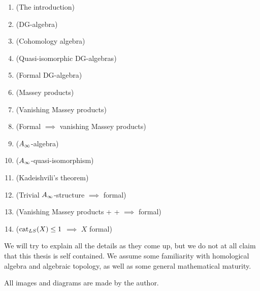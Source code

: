\begin{enumerate}
	\item {} (The introduction)
	\item {} (DG-algebra)
	\item {} (Cohomology algebra)
	\item {} (Quasi-isomorphic DG-algebras)
	\item {} (Formal DG-algebra)
	\item {} (Massey products)
	\item {} (Vanishing Massey products)
	\item {} (Formal $\implies$ vanishing Massey products)
	\item {} ($A_{\infty}$-algebra)
	\item {} ($A_{\infty}$-quasi-isomorphism)
	\item {} (Kadeishvili's theorem)
	\item {} (Trivial $A_{\infty}$-structure $\implies$ formal)
	\item {} (Vanishing Massey products + + $\implies$ formal)
	\item {} ($\text{cat}_{LS}(X)\leq 1$ $\implies$ $X$ formal)
\end{enumerate}

We will try to explain all the details as they come up, but we do not at all claim that this thesis is self contained. We assume some familiarity with homological algebra and algebraic topology, as well as some general mathematical maturity. 

All images and diagrams are made by the author. 